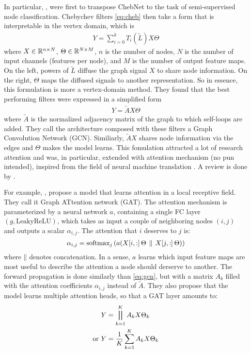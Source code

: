 In particular, \cite{kipf2016semi}, were first to transpose ChebNet to the task of semi-supervised node classification. Chebychev filters \eqref{eq:cheb} then take a form that is interpretable in the vertex domain, which is
\begin{gather}
Y = \displaystyle\sum_{i=0}^k T_i(\widetilde{L}) X \Theta
\end{gather}
where $X \in \bbr^{n \times N}$, $\Theta \in \bbr^{N \times M}$, $n$ is the number of nodes, $N$ is the number of input channels (features per node), and $M$ is the number of output feature maps. On the left, powers of $\widetilde{L}$ diffuse the graph signal $X$ to share node information. On the right, $\Theta$ maps the diffused signals to another representation. So in essence, this formulation is more a vertex-domain method. They found that the best performing filters were expressed in a simplified form
\begin{gather}
Y = \widetilde{A} X \Theta \label{eq:gcn}
\end{gather}
where $\widetilde{A}$ is the normalized adjacency matrix of the graph to which self-loops are added. They call the architecture composed with these filters a Graph Convolution Network (GCN). Similiarly, $\widetilde{A}X$ shares node information via the edges and $\Theta$ makes the model learns. This fomulation attracted a lot of research attention and was, in particular, extended with attention mechanism (no pun intended), inspired from the field of neural machine translation \citep{bahdanau2014neural}. A review is done by \cite{lee2018attention}.

For example, \cite{velickovic2017graph}, propose a model that learns attention in a local receptive field. They call it Graph ATtention network (GAT). The attention mechanism is parameterized by a neural network $a$, containing a single FC layer $(g,\text{LeakyReLU})$, which takes as input a couple of neighboring nodes $(i,j)$ and outputs a scalar $\alpha_{i,j}$. The attention that $i$ deserves to $j$ is:
\begin{gather}
\alpha_{i,j} = \text{softmax}_j\left(a( X[i,:] \h{2} \Theta \h{2} \mathbin{\|} \h{2} X[j,:] \h{2} \Theta )\right)
\end{gather}
where $\mathbin{\|}$ denotes concatenation. In a sense, $a$ learns which input feature maps are most useful to describe the attention a node should derserve to another. The forward propagation is done similarly than \eqref{eq:gcn}, but with a matrix $A_k$ filled with the attention coefficients $\alpha_{i,j}$ instead of $\widetilde{A}$. They also propose that the model learns multiple attention heads, so that a GAT layer amounts to:
\begin{align}
Y &= \displaystyle\bigparallel_{k=1}^K A_k X \Theta_k\\
\text{or } Y &= \frac{1}K\displaystyle\sum_{k=1}^K A_k X \Theta_k
\end{align}

